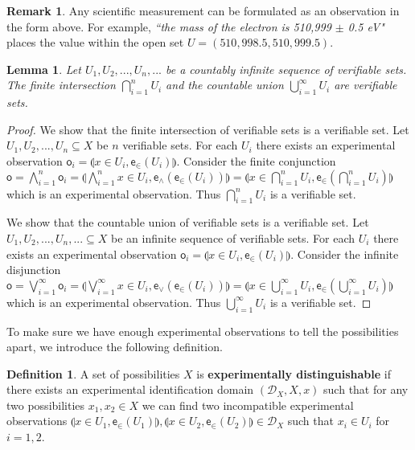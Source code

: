 \documentclass{amsart}
\newtheorem{lem}[thm]{Lemma}
\theoremstyle{definition}
\newtheorem{defn}[thm]{Definition}
\newtheorem{rem}[thm]{Remark}
\numberwithin{equation}{section}
\begin{document}
\begin{rem}
	Any scientific measurement can be formulated as an observation in the form above. For example, \emph{``the mass of the electron is 510,999 $\pm$ 0.5 eV"} places the value within the open set $U=(510,998.5 , 510,999.5)$.
\end{rem}

\begin{lem}
\label{setbehavior}
	Let $U_1, U_2, ... , U_n, ...$ be a countably infinite sequence of verifiable sets. The finite intersection $\bigcap\limits_{i=1}^{n} U_i$ and the countable union $\bigcup\limits_{i=1}^{\infty} U_i$ are verifiable sets.
\end{lem}

\begin{proof}
	We show that the finite intersection of verifiable sets is a verifiable set. Let $U_1, U_2, ... , U_n \subseteq X$ be $n$ verifiable sets. For each $U_i$ there exists an experimental observation $\mathsf{o}_i = \llparenthesis x\in U_i, \mathsf{e}_\in(U_i) \rrparenthesis$. Consider the finite conjunction $\mathsf{o} = \bigwedge\limits_{i=1}^{n} \mathsf{o}_i = \llparenthesis \bigwedge\limits_{i=1}^{n} x\in U_i , \mathsf{e}_{\wedge}(\mathsf{e}_\in(U_i)) \rrparenthesis=\llparenthesis x\in \bigcap\limits_{i=1}^{n} U_i, \mathsf{e}_\in(\bigcap\limits_{i=1}^{n} U_i)\rrparenthesis$ which is an experimental observation. Thus $\bigcap\limits_{i=1}^{n} U_i$ is a verifiable set.
	
	We show that the countable union of verifiable sets is a verifiable set. Let $U_1, U_2, ... , U_n, ... \subseteq X$ be an infinite sequence of verifiable sets. For each $U_i$ there exists an experimental observation $\mathsf{o}_i = \llparenthesis x\in U_i, \mathsf{e}_\in(U_i)\rrparenthesis$. Consider the infinite disjunction $\mathsf{o} = \bigvee\limits_{i=1}^{\infty} \mathsf{o}_i = \llparenthesis\bigvee\limits_{i=1}^{\infty} x\in U_i, \mathsf{e}_{\vee}(\mathsf{e}_\in(U_i))\rrparenthesis=\llparenthesis x\in \bigcup\limits_{i=1}^{\infty} U_i, \mathsf{e}_\in(\bigcup\limits_{i=1}^{\infty} U_i)\rrparenthesis$ which is an experimental observation. Thus $\bigcup\limits_{i=1}^{\infty} U_i$ is a verifiable set.
\end{proof}

To make sure we have enough experimental observations to tell the possibilities apart, we introduce the following definition.

\begin{defn}
A set of possibilities $X$ is \textbf{experimentally distinguishable} if there exists an experimental identification domain $(\mathcal{D}_X, X, x)$ such that for any two possibilities $x_1, x_2 \in X$ we can find two incompatible experimental observations $\llparenthesis x\in U_1, \mathsf{e}_\in(U_1)\rrparenthesis, \llparenthesis x\in U_2, \mathsf{e}_\in(U_2)\rrparenthesis\in\mathcal{D}_X$ such that $x_i\in U_i$ for $i=1,2$. 
\end{defn}
\end{document}
